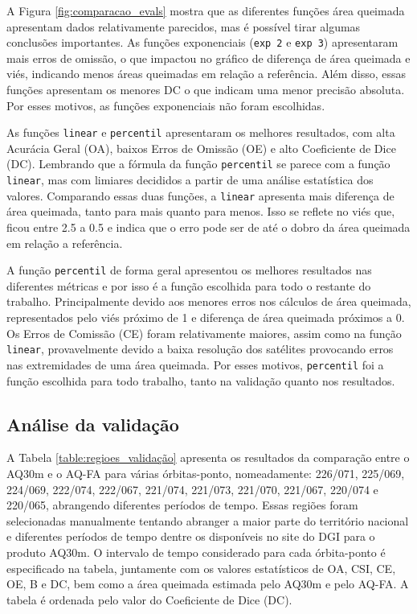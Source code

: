 \documentclass[cic,tc]{iiufrgs}
\begin{document}
A Figura \ref{fig:comparacao_evals} mostra que as diferentes funções área queimada apresentam dados relativamente parecidos, mas é possível tirar algumas conclusões importantes. As funções exponenciais (\texttt{exp 2} e \texttt{exp 3}) apresentaram mais erros de omissão, o que impactou no gráfico de diferença de área queimada e viés, indicando menos áreas queimadas em relação a referência. Além disso, essas funções apresentam os menores DC o que indicam uma menor precisão absoluta. Por esses motivos, as funções exponenciais não foram escolhidas.

As funções \texttt{linear} e \texttt{percentil} apresentaram os melhores resultados, com alta Acurácia Geral (OA), baixos Erros de Omissão (OE) e alto Coeficiente de Dice (DC). Lembrando que a fórmula da função \texttt{percentil} se parece com a função \texttt{linear}, mas com limiares decididos a partir de uma análise estatística dos valores. Comparando essas duas funções, a \texttt{linear} apresenta mais diferença de área queimada, tanto para mais quanto para menos. Isso se reflete no viés que, ficou entre 2.5 a 0.5 e indica que o erro pode ser de até o dobro da área queimada em relação a referência.

A função \texttt{percentil} de forma geral apresentou os melhores resultados nas diferentes métricas e por isso é a função escolhida para todo o restante do trabalho. Principalmente devido aos menores erros nos cálculos de área queimada, representados pelo viés próximo de 1 e diferença de área queimada próximos a 0. Os Erros de Comissão (CE) foram relativamente maiores, assim como na função \texttt{linear}, provavelmente devido a baixa resolução dos satélites provocando erros nas extremidades de uma área queimada. Por esses motivos, \texttt{percentil} foi a função escolhida para todo trabalho, tanto na validação quanto nos resultados.

\subsection*{Análise da validação}

A Tabela \ref{table:regioes_validação} apresenta os resultados da comparação entre o AQ30m e o AQ-FA para várias órbitas-ponto, nomeadamente: 226/071, 225/069, 224/069, 222/074, 222/067, 221/074, 221/073, 221/070, 221/067, 220/074 e 220/065, abrangendo diferentes períodos de tempo. Essas regiões foram selecionadas manualmente tentando abranger a maior parte do território nacional e diferentes períodos de tempo dentre os disponíveis no site do DGI para o produto AQ30m. O intervalo de tempo considerado para cada órbita-ponto é especificado na tabela, juntamente com os valores estatísticos de OA, CSI, CE, OE, B e DC, bem como a área queimada estimada pelo AQ30m e pelo AQ-FA. A tabela é ordenada pelo valor do Coeficiente de Dice (DC).
\end{document}
